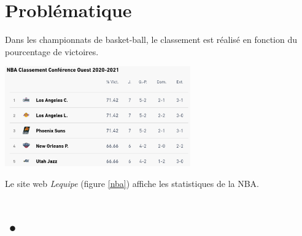 \documentclass[a4paper,11pt]{article}
\begin{document}
\begin{Form}
\section{Problématique}
Dans les championnats de basket-ball, le classement est réalisé en fonction du pourcentage de victoires.
\begin{center}
\centering
\includegraphics[width=8cm]{ressources/nba-lequipe.png}
\label{nba}
\end{center}
Le site web \emph{Lequipe} (figure \ref{nba}) affiche les statistiques de la NBA.
\begin{center}
\end{center}
\section{•}
\end{Form}
\end{document}
